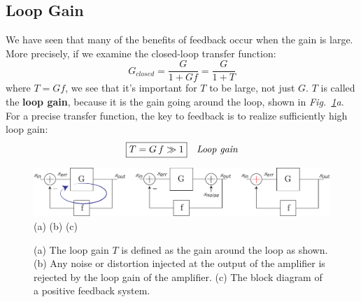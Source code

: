 \subsection{Loop Gain}
We have seen that many of the benefits of feedback occur when the gain is large.  More precisely, if we examine the closed-loop transfer function:
    \begin{equation}
        {G_{closed}} = \frac{G}{{1 + Gf}} = \frac{G}{{1 + T}}
    \end{equation}
where $T = Gf$, we see that it's important for $T$ to be large, not just $G$.  $T$ is called the \textbf{loop gain}, because it is the gain going around the loop, shown in \emph{Fig.~\ref{fig:fbblock_gain_noise_pos}a}.  For a precise transfer function, the key to feedback is to realize sufficiently high loop gain:
    \begin{align}
        \Aboxed{T &= G\,f \gg 1}
        &\textit{Loop gain}
        \label{eq:loop_gain}
    \end{align}
\newpage
\begin{figure}[H]
\centering
\includegraphics[scale=.475]{fbblock_gain_noise_pos}\\
(a) \qquad \qquad \qquad \qquad \qquad \qquad (b) \qquad \qquad \qquad \qquad \qquad \qquad (c)
\caption{(a) The loop gain $T$ is defined as the gain around the loop as shown.  (b) Any noise or distortion injected at the output of the amplifier is rejected by the loop gain of the amplifier.  (c) The block diagram of a positive feedback system.}
\label{fig:fbblock_gain_noise_pos}
\end{figure}
